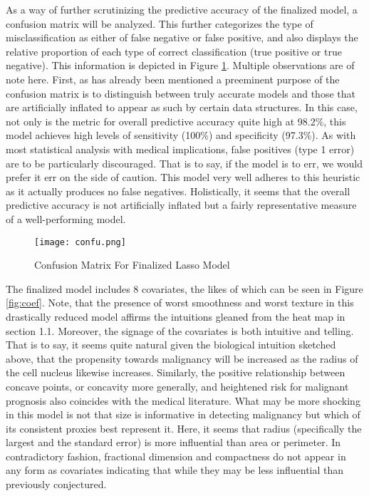 \documentclass[11pt]{article}
\begin{document}
	As a way of further scrutinizing the predictive accuracy of the finalized model, a confusion matrix will be analyzed.  This further categorizes the type of misclassification as either of false negative or false positive, and also displays the relative proportion of each type of correct classification (true positive or true negative).  This information is depicted in Figure \ref{fig:conf}.    Multiple observations are of note here.  First, as has already been mentioned a preeminent purpose of the confusion matrix is to distinguish between truly accurate models and those that are artificially inflated to appear as such by certain data structures.  In this case, not only is the metric for overall predictive accuracy quite high at 98.2\%, this model achieves high levels of sensitivity (100\%) and specificity (97.3\%).  As with most statistical analysis with medical implications, false positives (type 1 error) are to be particularly discouraged.  That is to say, if the model is to err, we would prefer it err on the side of caution.  This model very well adheres to this heuristic as it actually produces no false negatives.  Holistically, it seems that the overall predictive accuracy is not artificially inflated but a fairly representative measure of a well-performing model.  


\begin{figure}[htbp]
\centerline{\texttt{[image: confu.png]}}
\caption{Confusion Matrix For Finalized Lasso Model}\label{fig:conf}
\end{figure}
	


	The finalized model includes 8 covariates, the likes of which can be seen in Figure \ref{fig:coef}.  Note, that the presence of worst smoothness and worst texture in this drastically reduced model affirms the intuitions gleaned from the heat map in section 1.1.  Moreover, the signage of the covariates is both intuitive and telling.  That is to say, it seems quite natural given the biological intuition sketched above, that the propensity towards malignancy will be increased as the radius of the cell nucleus likewise increases.  Similarly, the positive relationship between concave points, or concavity more generally, and heightened risk for malignant prognosis also coincides with the medical literature.  What may be more shocking in this model is not that size is informative in detecting malignancy but which of its consistent proxies best represent it.  Here, it seems that radius (specifically the largest and the standard error) is more influential than area or perimeter.  In contradictory fashion, fractional dimension and compactness do not appear in any form as covariates indicating that while they may be less influential than previously conjectured.  
\end{document}
